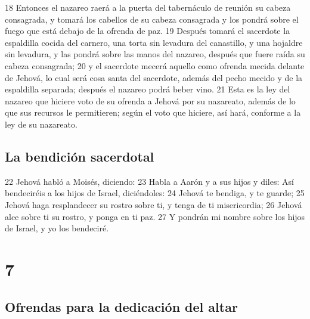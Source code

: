 18 Entonces el nazareo raerá a la puerta del tabernáculo de reunión su cabeza consagrada, y tomará los cabellos de su cabeza consagrada y los pondrá sobre el fuego que está debajo de la ofrenda de paz.
19 Después tomará el sacerdote la espaldilla cocida del carnero, una torta sin levadura del canastillo, y una hojaldre sin levadura, y las pondrá sobre las manos del nazareo, después que fuere raída su cabeza consagrada;
20 y el sacerdote mecerá aquello como ofrenda mecida delante de Jehová, lo cual será cosa santa del sacerdote, además del pecho mecido y de la espaldilla separada; después el nazareo podrá beber vino.
21 Esta es la ley del nazareo que hiciere voto de su ofrenda a Jehová por su nazareato, además de lo que sus recursos le permitieren; según el voto que hiciere, así hará, conforme a la ley de su nazareato.

\section*{La bendición sacerdotal}

22 Jehová habló a Moisés, diciendo:
23 Habla a Aarón y a sus hijos y diles: Así bendeciréis a los hijos de Israel, diciéndoles: 
24 Jehová te bendiga, y te guarde; 
25 Jehová haga resplandecer su rostro sobre ti, y tenga de ti misericordia; 
26 Jehová alce sobre ti su rostro, y ponga en ti paz. 
27 Y pondrán mi nombre sobre los hijos de Israel, y yo los bendeciré. 

\chapter{7}

\section*{Ofrendas para la dedicación del altar}

